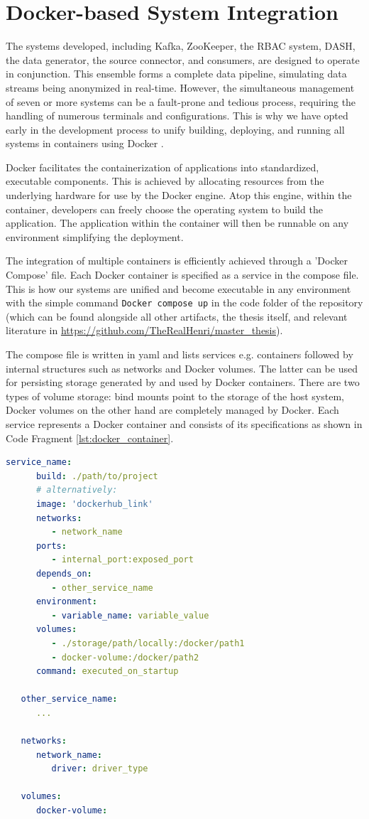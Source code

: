 \section{Docker-based System Integration}
The systems developed, including Kafka, ZooKeeper, the \ac{RBAC} system, \ac{DASH}, the data generator, the source connector, and consumers, are designed to operate in conjunction. This ensemble forms a complete data pipeline, simulating data streams being anonymized in real-time. However, the simultaneous management of seven or more systems can be a fault-prone and tedious process, requiring the handling of numerous terminals and configurations. This is why we have opted early in the development process to unify building, deploying, and running all systems in containers using Docker \cite{docker}. \par
Docker facilitates the containerization of applications into standardized, executable components. This is achieved by allocating resources from the underlying hardware for use by the Docker engine. Atop this engine, within the container, developers can freely choose the operating system to build the application. The application within the container will then be runnable on any environment simplifying the deployment. \par
The integration of multiple containers is efficiently achieved through a 'Docker Compose' file. Each Docker container is specified as a service in the compose file. This is how our systems are unified and become executable in any environment with the simple command \texttt{Docker compose up} in the code folder of the repository (which can be found alongside all other artifacts, the thesis itself, and relevant literature in \url{https://github.com/TheRealHenri/master_thesis}).\par
The compose file is written in yaml and lists services e.g. containers followed by internal structures such as networks and Docker volumes. The latter can be used for persisting storage generated by and used by Docker containers. There are two types of volume storage: bind mounts point to the storage of the host system, Docker volumes on the other hand are completely managed by Docker. 
Each service represents a Docker container and consists of its specifications as shown in Code Fragment \ref{lst:docker_container}. 

\begin{lstlisting}[language=yaml, captionpos=b, caption={Docker compose structure}, label={lst:docker_container}]
   service_name:
      build: ./path/to/project 
      # alternatively: 
      image: 'dockerhub_link'
      networks:
         - network_name
      ports: 
         - internal_port:exposed_port
      depends_on:
         - other_service_name
      environment: 
         - variable_name: variable_value
      volumes: 
         - ./storage/path/locally:/docker/path1
         - docker-volume:/docker/path2
      command: executed_on_startup
   
   other_service_name: 
      ...
   
   networks: 
      network_name: 
         driver: driver_type
   
   volumes: 
      docker-volume:
\end{lstlisting}
   
